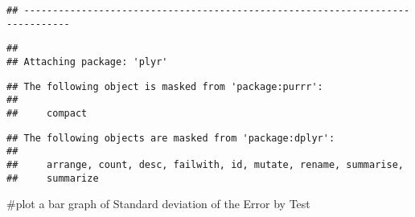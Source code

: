 \documentclass[
]{article}
\newenvironment{Shaded}{\begin{snugshade}}{\end{snugshade}}
\newcommand{\KeywordTok}[1]{\textcolor[rgb]{0.13,0.29,0.53}{\textbf{#1}}}
\newcommand{\NormalTok}[1]{#1}
\newcommand{\OperatorTok}[1]{\textcolor[rgb]{0.81,0.36,0.00}{\textbf{#1}}}
\newcommand{\StringTok}[1]{\textcolor[rgb]{0.31,0.60,0.02}{#1}}
\begin{document}
\begin{verbatim}
## ------------------------------------------------------------------------------
\end{verbatim}

\begin{verbatim}
## 
## Attaching package: 'plyr'
\end{verbatim}

\begin{verbatim}
## The following object is masked from 'package:purrr':
## 
##     compact
\end{verbatim}

\begin{verbatim}
## The following objects are masked from 'package:dplyr':
## 
##     arrange, count, desc, failwith, id, mutate, rename, summarise,
##     summarize
\end{verbatim}

\begin{Shaded}
\end{Shaded}

\#plot a bar graph of Standard deviation of the Error by Test
\end{document}
